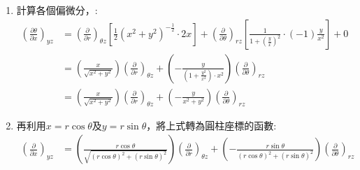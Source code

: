 \documentclass[../main.tex]{subfiles}
\begin{document}
\begin{itemize}
\begin{itemize}
\begin{enumerate}
\begin{equation}
          \end{equation}
          而因為(\ref{eq:cylindrical_r_to_cat})式，可知道$\left(\frac{\partial r}{\partial x}\right)_{yz}$\\
          ，(\ref{eq:cylindrical_theta_to_cat})式，可知道$\left(\frac{\partial \theta}{\partial x}\right)_{yz}$\\
          ，以及$z=z$，可知道$\left(\frac{\partial z}{\partial x}\right)_{yz}=0$
          \begin{equation}
            \left(\frac{\partial}{\partial x}\right)_{yz} =
            \left(\frac{\partial}{\partial r}\right)_{\theta z}\left[\frac{\partial }{\partial x}\sqrt{x^2 + y^2}\right]_{yz}
            + \left(\frac{\partial}{\partial \theta}\right)_{rz}\left[\frac{\partial }{\partial x}\tan^{-1}\left(\frac{y}{x}\right)\right]_{yz}
            + 0
          \end{equation}
        \item 計算各個偏微分，:
          \begin{align}
            \left(\frac{\partial \theta}{\partial x}\right)_{yz} &=
            \left(\frac{\partial}{\partial r}\right)_{\theta z}\left[
              \frac{1}{2}\left(x^2+y^2\right)^{-\frac{1}{2}} \cdot 2x
            \right]
            + \left(\frac{\partial}{\partial \theta}\right)_{rz}\left[
              \frac{1}{1+\left(\frac{y}{x}\right)^2} \cdot (-1)\frac{y}{x^2}
            \right]
            + 0 \nonumber\\
            &= \left(\frac{x}{\sqrt{x^2+y^2}}\right)\left(\frac{\partial}{\partial r}\right)_{\theta z}
            + \left(-\frac{y}{\left(1+ \frac{y^2}{x^2}\right)\cdot x^2}\right)\left(\frac{\partial}{\partial \theta}\right)_{rz} \nonumber\\
            &= \left(\frac{x}{\sqrt{x^2+y^2}}\right)\left(\frac{\partial}{\partial r}\right)_{\theta z}
            + \left(-\frac{y}{x^2+y^2}\right)\left(\frac{\partial}{\partial \theta}\right)_{rz}
          \end{align}
        \item 再利用$x = r\cos\theta$及$y = r\sin\theta$，將上式轉為圓柱座標的函數:
          \begin{align}
            \left(\frac{\partial}{\partial x}\right)_{yz} &=
            \left(\frac{r\cos\theta}{\sqrt{(r\cos\theta)^2+(r\sin\theta)^2}}\right)\left(\frac{\partial}{\partial r}\right)_{\theta z}
            + \left(-\frac{r\sin\theta}{(r\cos\theta)^2+(r\sin\theta)^2}\right)\left(\frac{\partial}{\partial \theta}\right)_{rz} \nonumber\\

\end{align}
\end{enumerate}
\end{itemize}
\end{itemize}
\end{document}
